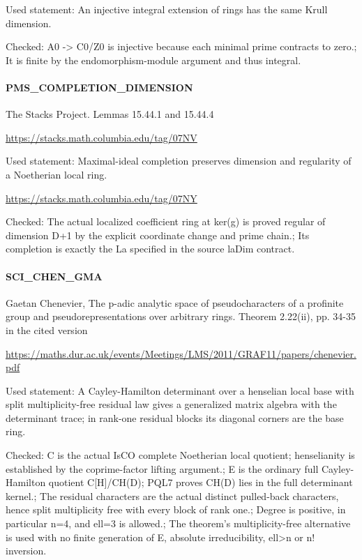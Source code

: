 Used statement: An injective integral extension of rings has the same Krull dimension.

Checked: A0 -> C0/\allowbreak{}Z0 is injective because each minimal prime contracts to zero.; It is finite by the endomorphism-module argument and thus integral.

\paragraph{PMS\_\allowbreak{}COMPLETION\_\allowbreak{}DIMENSION}The Stacks Project. Lemmas 15.44.1 and 15.44.4

\url{https://stacks.math.columbia.edu/tag/07NV}

Used statement: Maximal-ideal completion preserves dimension and regularity of a Noetherian local ring.

\url{https://stacks.math.columbia.edu/tag/07NY}

Checked: The actual localized coefficient ring at ker(g) is proved regular of dimension D+1 by the explicit coordinate change and prime chain.; Its completion is exactly the La specified in the source laDim contract.

\paragraph{SCI\_\allowbreak{}CHEN\_\allowbreak{}GMA}Gaetan Chenevier, The p-adic analytic space of pseudocharacters of a profinite group and pseudorepresentations over arbitrary rings. Theorem 2.22(ii), pp. 34-35 in the cited version

\url{https://maths.dur.ac.uk/events/Meetings/LMS/2011/GRAF11/papers/chenevier.pdf}

Used statement: A Cayley-Hamilton determinant over a henselian local base with split multiplicity-free residual law gives a generalized matrix algebra with the determinant trace; in rank-one residual blocks its diagonal corners are the base ring.

Checked: C is the actual IsCO complete Noetherian local quotient; henselianity is established by the coprime-factor lifting argument.; E is the ordinary full Cayley-Hamilton quotient C[H]/\allowbreak{}CH(D); PQL7 proves CH(D) lies in the full determinant kernel.; The residual characters are the actual distinct pulled-back characters, hence split multiplicity free with every block of rank one.; Degree is positive, in particular n=4, and ell=3 is allowed.; The theorem's multiplicity-free alternative is used with no finite generation of E, absolute irreducibility, ell>n or n! inversion.

